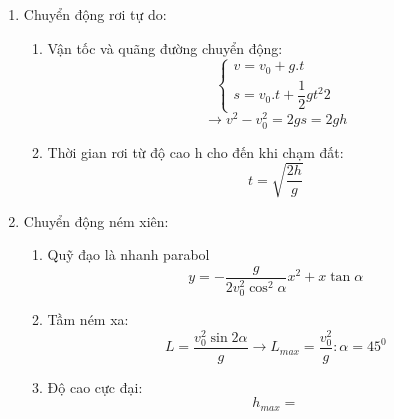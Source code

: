 \documentclass[12pt,a4paper]{report}
\begin{document}
{\begin{center}
\begin{enumerate}
\begin{enumerate}
                \item Một số công thức liên hệ: \[v = \omega r ; \quad T = \dfrac{2\pi}{\omega}\]
                \item Phương trình chuyển động: \[
                    \left\{
                    \begin{array}{lr}
                        \omega_{t} = \omega_{0} + \beta .t \\
                        \varphi_{t} = \varphi_{0} + \omega_{0}t + \dfrac{1}{2} \beta t^{2} \\
                        \beta = const
                    \end{array}
                    \right.  
                \]
                \item Trường hợp chuyển động tròn đều: \[
                    \left\{
                    \begin{array}{lr}
                        \omega = const \\
                        \varphi = \varphi_{0} + \omega_{0} t     
                    \end{array}
                    \right.
                \]
            \end{enumerate}

            \item Chuyển động rơi tự do:
            \begin{enumerate}
                \item Vận tốc và quãng đường chuyển động: \[
                    \left\{
                    \begin{array}{lr}
                    v = v_{0} + g.t \\
                    s = v_{0}.t + \dfrac{1}{2}gt^{2} 2       
                    \end{array}
                    \right.
                    \]
                    \[\rightarrow v^{2} - v_{0}^{2} = 2gs = 2gh\]
                \newpage
                \item Thời gian rơi từ độ cao h cho đến khi chạm đất:
                \[t = \sqrt{\dfrac{2h}{g}}\]
            \end{enumerate}
            \item  Chuyển động ném xiên:
            \begin{enumerate}
                \item Quỹ đạo là nhanh parabol
                \[ y = -\dfrac{g}{2v_{0}^{2} {\cos ^{2} \alpha}} x^{2} + x \tan \alpha\]
                \item Tầm ném xa: 
                \[L = \dfrac{v_{0}^{2} \sin 2\alpha}{g}  \rightarrow L_{max} = \dfrac{v_{0}^{2}}{g} : \alpha = 45^{0}\]    
                \item Độ cao cực đại:
                \[h_{max} = \]
            \end{enumerate}

    \end{enumerate}

\end{center}




}
\end{document}
